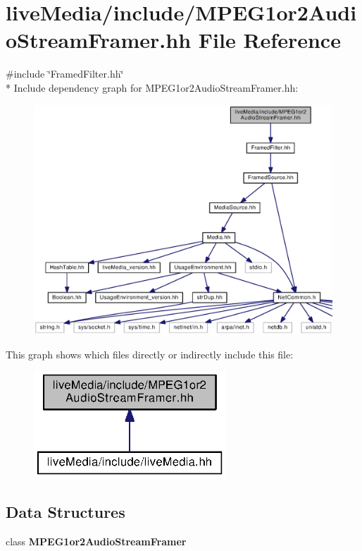 \section{live\+Media/include/\+M\+P\+E\+G1or2\+Audio\+Stream\+Framer.hh File Reference}
\label{MPEG1or2AudioStreamFramer_8hh}
{\ttfamily \#include \char`\"{}Framed\+Filter.\+hh\char`\"{}}\\*
Include dependency graph for M\+P\+E\+G1or2\+Audio\+Stream\+Framer.\+hh\+:
\nopagebreak
\begin{figure}[H]
\begin{center}
\leavevmode
\includegraphics[width=350pt]{MPEG1or2AudioStreamFramer_8hh__incl}
\end{center}
\end{figure}
This graph shows which files directly or indirectly include this file\+:
\nopagebreak
\begin{figure}[H]
\begin{center}
\leavevmode
\includegraphics[width=204pt]{MPEG1or2AudioStreamFramer_8hh__dep__incl}
\end{center}
\end{figure}
\subsection*{Data Structures}
\begin{DoxyCompactItemize}
\item 
class {\bf M\+P\+E\+G1or2\+Audio\+Stream\+Framer}
\end{DoxyCompactItemize}
